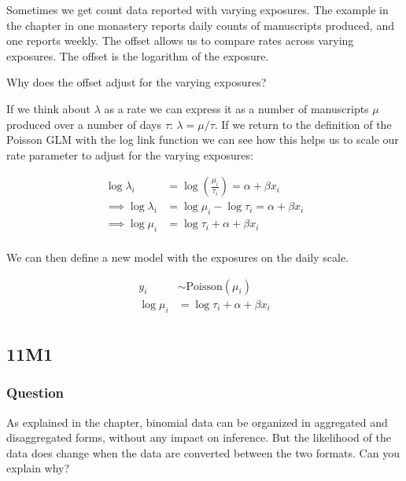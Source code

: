 \documentclass[
]{book}
\begin{document}
Sometimes we get count data reported with varying exposures. The example in the chapter in one monastery reports daily counts of manuscripts produced, and one reports weekly. The offset allows us to compare rates across varying exposures. The offset is the logarithm of the exposure.

Why does the offset adjust for the varying exposures?

If we think about \(\lambda\) as a rate we can express it as a number of manuscripts \(\mu\) produced over a number of days \(\tau\): \(\lambda = \mu/\tau\). If we return to the definition of the Poisson GLM with the log link function we can see how this helps us to scale our rate parameter to adjust for the varying exposures:

\[
\begin{aligned}
\log \lambda_i &= \log \left( \frac{\mu_i}{\tau_i} \right)= \alpha + \beta x_i \\
\implies \log \lambda_i &= \log\mu_i - \log\tau_i = \alpha + \beta x_i \\
\implies \log\mu_i &= \log\tau_i + \alpha + \beta x_i \\
\end{aligned}
\]

We can then define a new model with the exposures on the daily scale.

\[
\begin{aligned}
y_i &\sim \text{Poisson}(\mu_i) \\
\log \mu_i &= \log \tau_i + \alpha + \beta x_i \\
\end{aligned}
\]

\hypertarget{m1-6}{%
\subsection*{11M1}\label{m1-6}}

\hypertarget{question-85}{%
\subsubsection*{Question}\label{question-85}}

As explained in the chapter, binomial data can be organized in aggregated and disaggregated forms, without any impact on inference. But the likelihood of the data does change when the data are converted between the two formats. Can you explain why?
\end{document}
